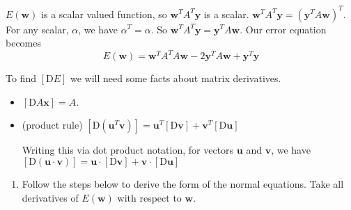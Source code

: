 \documentclass[12pt,letterpaper,noanswers]{exam}
\newcommand{\vc}[1]{\boldsymbol{#1}}
\begin{document}
\begin{tcolorbox}
    $E(\vc{w})$ is a scalar valued function, so $\vc{w}^TA^T\vc{y}$ is a scalar.  $\vc{w}^TA^T\vc{y}=(\vc{y}^TA\vc{w})^T$.  For any scalar, $\alpha$, we have $\alpha^T = \alpha$.  So $\vc{w}^TA^T\vc{y} = \vc{y}^TA\vc{w}$.  Our error equation becomes
    \[E(\vc{w}) = \vc{w}^TA^TA\vc{w}-2\vc{y}^TA\vc{w} + \vc{y}^T\vc{y}\]
    
To find $\left[\text{D}E\right]$ we will need some facts about matrix derivatives.
\begin{itemize}
\itemsep0pt
    \item $\left[\text{D} A\vc{x}\right] = A$.
    \item (product rule) $\left[\text{D}\left(\vc{u}^T\vc{v}\right)\right]= \vc{u}^T\left[\text{D}\vc{v}\right]+\vc{v}^T\left[\text{D}\vc{u}\right]$
    
    Writing this via dot product notation, for vectors $\vc{u}$ and $\vc{v}$, we have $\left[\text{D}\left(\vc{u}\cdot\vc{v}\right)\right]= \vc{u}\cdot\left[\text{D}\vc{v}\right]+\vc{v}\cdot\left[\text{D}\vc{u}\right]$
\end{itemize}
\end{tcolorbox}

\begin{enumerate}[resume=classQ]
    \item Follow the steps below to derive the form of the normal equations.  Take all derivatives of $E(\vc{w})$ with respect to $\vc{w}$.
\end{enumerate}  
  \vfill
 
\end{document}
